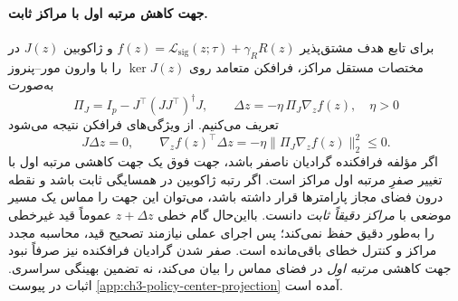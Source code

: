 \paragraph{جهت کاهش مرتبه اول با مراکز ثابت.}
برای تابع هدف مشتق‌پذیر
$f(z)=\mathcal L_{\mathrm{sig}}(z;\tau)
+\gamma_RR(z)$
و ژاکوبین $J(z)$
در مختصات مستقل مراکز،
فرافکن متعامد
روی $\ker J(z)$
را با وارون مور--پنروز
به‌صورت
\begin{equation}\label{eq:ch3-fixed-center-projection}
\boxed{
\Pi_J=I_p-J^\top(JJ^\top)^\dagger J,
\qquad
\Delta z=-\eta\,\Pi_J\nabla_z f(z),
\quad\eta>0
}
\end{equation}
تعریف می‌کنیم.
از ویژگی‌های فرافکن
نتیجه می‌شود
\begin{equation}\label{eq:ch3-fixed-center-projection-descent}
\boxed{
J\Delta z=0,
\qquad
\nabla_z f(z)^\top\Delta z
=-\eta\|\Pi_J\nabla_z f(z)\|_2^2\le0.
}
\end{equation}
اگر مؤلفه فرافکنده
گرادیان ناصفر باشد،
جهت فوق یک جهت
کاهشی مرتبه اول
با تغییر صفرِ
مرتبه اول مراکز
است. اگر رتبه ژاکوبین
در همسایگی ثابت باشد
و نقطه درون فضای
مجاز پارامترها قرار
داشته باشد، می‌توان
این جهت را مماس
یک مسیر موضعی
با \emph{مراکز
دقیقاً ثابت} دانست.
بااین‌حال گام خطی
$z+\Delta z$
عموماً قید غیرخطی
را به‌طور دقیق
حفظ نمی‌کند؛
پس اجرای عملی
نیازمند تصحیح قید،
محاسبه مجدد مراکز
و کنترل خطای
باقی‌مانده است.
صفر شدن گرادیان
فرافکنده نیز
صرفاً نبود جهت
کاهشی \emph{مرتبه اول}
در فضای مماس را
بیان می‌کند،
نه تضمین بهینگی
سراسری. اثبات در
پیوست
\ref{app:ch3-policy-center-projection}
آمده است.

